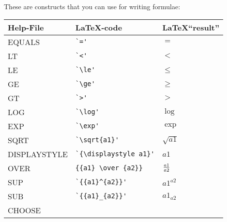 \documentclass[a4paper]{article}
\begin{document}
These are constructs that you can use for writing formulae:\\
\samepage
\begin{tabular}{l@{\ \ $\to$\ \ }l@{\ \ $\longrightarrow$\ \ }l}
\hline
Help-File & \LaTeX-code & \LaTeX ``result'' \\
\hline\hline

EQUALS          & \verb#`='#    & $ = $ \\
LT              & \verb#`<'#    & $ < $ \\
LE              & \verb#`\le'#  & $ \le $ \\
GE              & \verb#`\ge'#  & $ \ge $ \\
GT              & \verb#`>'#    & $ > $ \\
LOG             & \verb#`\log'#         & $ \log $ \\
EXP             & \verb#`\exp'#         & $ \exp $ \\
SQRT            & \verb#`\sqrt{a1}'#    & $ \sqrt{a1} $ \\
DISPLAYSTYLE    & \verb#`{\displaystyle a1}'#   & $ {\displaystyle a1} $ \\
OVER            & \verb#{{a1} \over {a2}}#      & $ {{a1} \over {a2}} $ \\
SUP             & \verb#`{{a1}^{a2}}'#  & $ {{a1}^{a2}} $ \\
SUB             & \verb#`{{a1}_{a2}}'#  & $ {{a1}_{a2}} $ \\
CHOOSE          & \footnotesize

\end{tabular}
\end{document}
